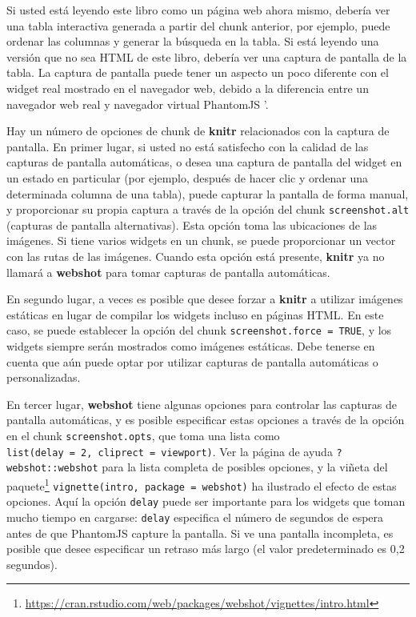\documentclass[12pt,]{krantz}
\renewcommand{\href}[2]{#2\footnote{\url{#1}}}
\theoremstyle{definition}
\theoremstyle{definition}
\theoremstyle{definition}
\theoremstyle{remark}
\begin{document}
Si usted está leyendo este libro como un página web ahora mismo, debería
ver una tabla interactiva generada a partir del chunk anterior, por
ejemplo, puede ordenar las columnas y generar la búsqueda en la tabla.
Si está leyendo una versión que no sea HTML de este libro, debería ver
una captura de pantalla de la tabla. La captura de pantalla puede tener
un aspecto un poco diferente con el widget real mostrado en el navegador
web, debido a la diferencia entre un navegador web real y navegador
virtual PhantomJS '.

Hay un número de opciones de chunk de \textbf{knitr} relacionados con la
captura de pantalla. En primer lugar, si usted no está satisfecho con la
calidad de las capturas de pantalla automáticas, o desea una captura de
pantalla del widget en un estado en particular (por ejemplo, después de
hacer clic y ordenar una determinada columna de una tabla), puede
capturar la pantalla de forma manual, y proporcionar su propia captura a
través de la opción del chunk \texttt{screenshot.alt} (capturas de
pantalla alternativas). Esta opción toma las ubicaciones de las
imágenes. Si tiene varios widgets en un chunk, se puede proporcionar un
vector con las rutas de las imágenes. Cuando esta opción está presente,
\textbf{knitr} ya no llamará a \textbf{webshot} para tomar capturas de
pantalla automáticas.

En segundo lugar, a veces es posible que desee forzar a \textbf{knitr} a
utilizar imágenes estáticas en lugar de compilar los widgets incluso en
páginas HTML. En este caso, se puede establecer la opción del chunk
\texttt{screenshot.force\ =\ TRUE}, y los widgets siempre serán
mostrados como imágenes estáticas. Debe tenerse en cuenta que aún puede
optar por utilizar capturas de pantalla automáticas o personalizadas.

En tercer lugar, \textbf{webshot} tiene algunas opciones para controlar
las capturas de pantalla automáticas, y es posible especificar estas
opciones a través de la opción en el chunk \texttt{screenshot.opts}, que
toma una lista como
\texttt{list(delay\ =\ 2,\ cliprect\ =\ \textquotesingle{}viewport\textquotesingle{})}.
Ver la página de ayuda \texttt{?} \texttt{webshot::webshot} para la
lista completa de posibles opciones, y la
\href{https://cran.rstudio.com/web/packages/webshot/vignettes/intro.html}{viñeta
del paquete}
\texttt{vignette(\textquotesingle{}intro\textquotesingle{},\ package\ =\ \textquotesingle{}webshot\textquotesingle{})}
ha ilustrado el efecto de estas opciones. Aquí la opción \texttt{delay}
puede ser importante para los widgets que toman mucho tiempo en
cargarse: \texttt{delay} especifica el número de segundos de espera
antes de que PhantomJS capture la pantalla. Si ve una pantalla
incompleta, es posible que desee especificar un retraso más largo (el
valor predeterminado es 0,2 segundos).
\end{document}
